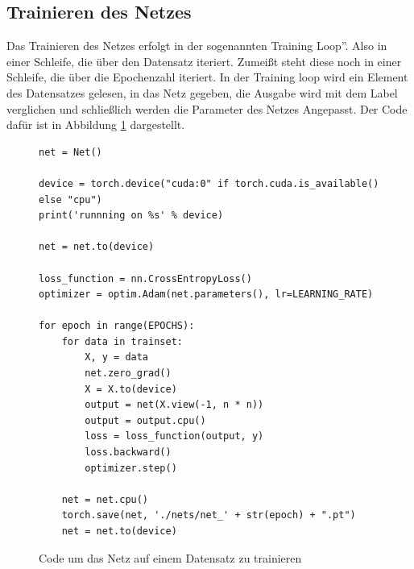 \documentclass{article}
\begin{document}
\subsection{Trainieren des Netzes}
Das Trainieren des Netzes erfolgt in der sogenannten \glqq Training Loop''. Also in einer Schleife, die über den Datensatz iteriert. Zumeißt steht diese noch in einer Schleife, die über die Epochenzahl iteriert. In der Training loop wird ein Element des Datensatzes gelesen, in das Netz gegeben, die Ausgabe wird mit dem Label verglichen und schließlich werden die Parameter des Netzes Angepasst. Der Code dafür ist in Abbildung \ref{Code_train_loop} dargestellt.
 \begin{figure}[h]
 	\begin{verbatim}
net = Net()

device = torch.device("cuda:0" if torch.cuda.is_available() else "cpu")
print('runnning on %s' % device)

net = net.to(device)

loss_function = nn.CrossEntropyLoss()
optimizer = optim.Adam(net.parameters(), lr=LEARNING_RATE)

for epoch in range(EPOCHS):
	for data in trainset:
		X, y = data
		net.zero_grad() 
		X = X.to(device)
		output = net(X.view(-1, n * n))
		output = output.cpu()
		loss = loss_function(output, y)  
		loss.backward() 
		optimizer.step()  
		
	net = net.cpu()
	torch.save(net, './nets/net_' + str(epoch) + ".pt")
	net = net.to(device)

 	\end{verbatim}
 	\caption{Code um das Netz auf einem Datensatz zu trainieren}
 	\label{Code_train_loop}
 \end{figure}\\
\end{document}
